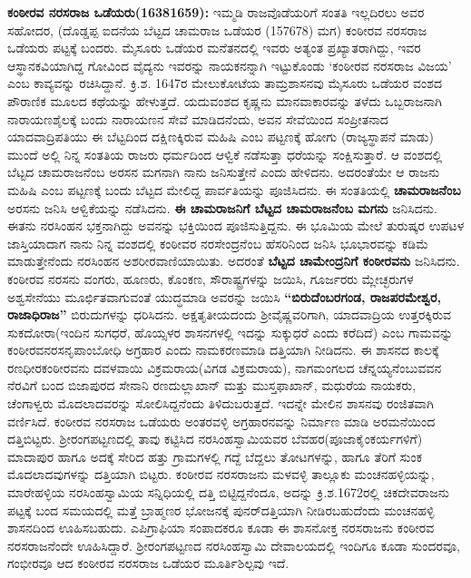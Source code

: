 \textbf{ ಕಂಠೀರವ ನರಸರಾಜ ಒಡೆಯರು(16381659):} ಇಮ್ಮಡಿ ರಾಜವೊಡೆಯರಿಗೆ ಸಂತತಿ ಇಲ್ಲದಿರಲು ಅವರ ಸಹೋದರ, (ದೊಡ್ಡಪ್ಪ ಐದನೆಯ ಬೆಟ್ಟದ ಚಾಮರಾಜ ಒಡೆಯರ (157678) ಮಗ) ಕಂಠೀರವ ನರಸರಾಜ ಒಡೆಯರು ಪಟ್ಟಕ್ಕೆ ಬಂದರು. ಮೈಸೂರು ಒಡೆಯರ ಮನೆತನದಲ್ಲಿ ಇವರು ಅತ್ಯಂತ ಪ್ರಖ್ಯಾತರಾಗಿದ್ದು, ಇವರ ಆಸ್ಥಾನಕವಿಯಾಗಿದ್ದ ಗೋವಿಂದ ವೈದ್ಯನು ಇವರನ್ನು ನಾಯಕನನ್ನಾಗಿ ಇಟ್ಟುಕೊಂಡು ‘ಕಂಠೀರವ ನರಸರಾಜ ವಿಜಯ’ ಎಂಬ ಕಾವ್ಯವನ್ನು ರಚಿಸಿದ್ದಾನೆ. ಕ್ರಿ.ಶ. 1647ರ ಮೇಲುಕೋಟೆಯ ತಾಮ್ರಶಾಸನವು ಮೈಸೂರು ಒಡೆಯರ ವಂಶದ ಪೌರಾಣಿಕ ಮೂಲದ ಕಥೆಯನ್ನು ಹೇಳುತ್ತದೆ. ಯದುವಂಶದ ಕೃಷ್ಣನು ಮಾನವಾಕಾರವನ್ನು ತಳೆದು ಒಬ್ಬರಾಜನಾಗಿ ನಾರಾಯಣಶೈಲಕ್ಕೆ ಬಂದು ನಾರಾಯಣನ ಸೇವೆ ಮಾಡಿದನೆಂದು, ಅವನ ಸೇವೆಯಿಂದ ಸಂಪ್ರೀತನಾದ ಯಾದವಾದ್ರಿಪತಿಯು ಈ ಬೆಟ್ಟದಿಂದ ದಕ್ಷಿಣಕ್ಕಿರುವ ಮಹಿಷಿ ಎಂಬ ಪಟ್ಟಣಕ್ಕೆ ಹೋಗು (ರಾಜ್ಯಸ್ಥಾಪನೆ ಮಾಡು) ಮುಂದೆ ಅಲ್ಲಿ ನಿನ್ನ ಸಂತತಿಯ ರಾಜರು ಧರ್ಮದಿಂದ ಆಳ್ವಿಕೆ ನಡೆಸುತ್ತಾ ಧರೆಯನ್ನು ಸಂಕ್ಷಿಸುತ್ತಾರೆ. ಆ ವಂಶದಲ್ಲಿ ಬೆಟ್ಟದ ಚಾಮರಾಜನೆಂಬ ಅರಸನ ಮಗನಾಗಿ ನಾನು ಜನಿಸುತ್ತೇನೆ ಎಂದು ಹೇಳಿದನು. ಅದರಂತೆಯೇ ಆ ರಾಜನು ಮಹಿಷಿ ಎಂಬ ಪಟ್ಟಣಕ್ಕೆ ಬಂದು ಬೆಟ್ಟದ ಮೇಲಿದ್ದ ಪಾರ್ವತಿಯನ್ನು ಪೂಜಿಸಿದನು. ಈ ಸಂತತಿಯಲ್ಲಿ \textbf{ಚಾಮರಾಜನೆಂಬ} ಅರಸನು ಜನಿಸಿ ಆಳ್ವಿಕೆಯನ್ನು ನಡೆಸಿದನು. \textbf{ಈ ಚಾಮರಾಜನಿಗೆ ಬೆಟ್ಟದ ಚಾಮರಾಜನೆಂಬ ಮಗನು} ಜನಿಸಿದನು. ಈತನು ನರಸಿಂಹನ ಭಕ್ತನಾಗಿದ್ದು ಅವನನ್ನು ಭಕ್ತಿಯಿಂದ ಪೂಜಿಸುತ್ತಿದ್ದನು. ಈ ಭೂಮಿಯ ಮೇಲೆ ತುರುಷ್ಕರ ಉಪಟಳ ಜಾಸ್ತಿಯಾದಾಗ ನಾನು ನಿನ್ನ ವಂಶದಲ್ಲಿ ಕಂಠೀವರ ನರಸೇಂದ್ರನೆಂಬ ಹೆಸರಿನಿಂದ ಜನಿಸಿ ಭೂಭಾರವನ್ನು ಕಡಿಮೆ ಮಾಡುತ್ತೇನೆಂದು ನರಸಿಂಹನ ಅಶರೀರವಾಣಿಯಾಯಿತು. ಅದರಂತೆ \textbf{ಬೆಟ್ಟದ ಚಾಮೇಂದ್ರನಿಗೆ ಕಂಠೀರವನು} ಜನಿಸಿದನು. ಕಂಠೀರವ ನರಸನು ವಂಗರು, ಹೂಣರು, ಕೊಂಕಣ, ಸೌರಾಷ್ಟ್ರಗಳನ್ನು ಜಯಿಸಿ, ಗೂರ್ಜರರು ಮ್ಲೇಚ್ಛರುಗಳ ಅಶ್ವಸೇನೆಯು ಮೂರ್ಛಿತವಾಗುವಂತೆ ಯುದ್ಧಮಾಡಿ ಅವರನ್ನು ಜಯಿಸಿ \textbf{“ಬಿರುದೆಂಬರಗಂಡ, ರಾಜಪರಮೇಶ್ವರ, ರಾಜಾಧಿರಾಜ”} ಬಿರುದುಗಳನ್ನು ಧರಿಸಿದನು. ಅಕ್ಷತೃತೀಯದಂದು ಶ‍್ರೀವೈಷ್ಣವರಿಗಾಗಿ, ಯಾದವಾದ್ರಿಯ ಉತ್ತರಕ್ಕಿರುವ ಸುಕದೋರಾ(ಇಂದಿನ ಸುಗಧರೆ, ಹೊಯ್ಸಳರ ಶಾಸನಗಳಲ್ಲಿ ಇದನ್ನು ಸುಕ್ಕುಧರೆ ಎಂದು ಕರೆದಿದೆ) ಎಂಬ ಗಾಮವನ್ನು ಕಂಠೀರವನರಸನೃಪಾಂಬೋಧಿ ಅಗ್ರಹಾರ ಎಂದು ನಾಮಕರಣಮಾಡಿ ದತ್ತಿಯಾಗಿ ನೀಡಿದನು. ಈ ಶಾಸನದ ಕಾಲಕ್ಕೆ ರಣಧೀರಕಂಠೀರವನು ದವಳವಾಯಿ ವಿಕ್ರಮರಾಯ(ವಿಗಡ ವಿಕ್ರಮರಾಯ), ನಾಗಮಂಗಲದ ಚೆನ್ನಯ್ಯನೆಂಬುವವನ ನೆರವಿಗೆ ಬಂದ ಬಿಜಾಪುರದ ಸೇನಾನಿ ರಣದುಲ್ಲಾಖಾನ್​ ಮತ್ತು ಮುಸ್ತಫಾಖಾನ್​, ಮಧುರೆಯ ನಾಯಕರು, ಚೆಂಗಾಳ್ವರು ಮೊದಲಾದವರನ್ನು ಸೋಲಿಸಿದ್ದನೆಂದು ತಿಳಿದುಬರುತ್ತದೆ. ಇದನ್ನೇ ಮೇಲಿನ ಶಾಸನವು ರಂಜಿತವಾಗಿ ವರ್ಣಿಸಿದೆ. ಕಂಠೀರವ ನರಸರಾಜ ಒಡೆಯರು ಅಂತರವಳ್ಳಿ ಅಗ್ರಹಾರನವನ್ನು ನಿರ್ಮಾಣ ಮಾಡಿ ಅರಮನೆಯಿಂದ ದತ್ತಿಬಿಟ್ಟರು. ಶ‍್ರೀರಂಗಪಟ್ಟಣದಲ್ಲಿ ತಾವು ಕಟ್ಟಿಸಿದ ನರಸಿಂಹಸ್ವಾಮಿಯವರ ಬೆವಹರ(ಪೂಜಾಕೈಂಕರ್ಯ\-ಗಳಿಗೆ) ಮಾದಾಪುರ ಹಾಗೂ ಅದಕ್ಕೆ ಸೇರಿದ ಹತ್ತು ಗ್ರಾಮಗಳಲ್ಲಿ ಗದ್ದೆ ಬೆದ್ದಲು ತೋಟಗಳನ್ನು, ಹಾಗೂ ತೆರಿಗೆ ಸುಂಕ ಮೊದಲಾದವುಗಳನ್ನು ದತ್ತಿಯಾಗಿ ಬಿಟ್ಟರು. ಕಂಠೀರವ ನರಸರಾಜನು ಮಳವಳ್ಳಿ ತಾಲ್ಲೂಕು ಮಂಚನಹಳ್ಳಿಯನ್ನು, ಮಾರೇಹಳ್ಳಿಯ ನರಸಿಂಹಸ್ವಾಮಿಯ ಸನ್ನಿಧಿಯಲ್ಲಿ ದತ್ತಿ ಬಿಟ್ಟಿದ್ದನೆಂದೂ, ಅದನ್ನು ಕ್ರಿ.ಶ.1672ರಲ್ಲಿ ಚಿಕದೇವರಾಜನು ಪಟ್ಟಕ್ಕೆ ಬಂದ ಸಮಯದಲ್ಲಿ ಮತ್ತೆ ಬ್ರಾಹ್ಮಣರ ಭೋಜನಕ್ಕೆ ಪುನರ್​ ದತ್ತಿಯಾಗಿ ನೀಡಿರಬಹುದೆಂದು ಮಂಚನಹಳ್ಳಿ ಶಾಸನದಿಂದ ಊಹಿಸಬಹುದು. ಎಪಿಗ್ರಾಫಿಯಾ ಸಂಪಾದಕರೂ ಕೂಡಾ ಈ ಶಾಸನೋಕ್ತ ನರಸರಾಜನು ಕಂಠೀರವ ನರಸರಾಜನೆಂದೇ ಊಹಿಸಿದ್ದಾರೆ. ಶ‍್ರೀರಂಗಪಟ್ಟಣದ ನರಸಿಂಹಸ್ವಾಮಿ ದೇವಾಲಯದಲ್ಲಿ ಇಂದಿಗೂ ಕೂಡಾ ಸುಂದರವೂ, ಗಂಭೀರವೂ ಆದ ಕಂಠೀರವ ನರಸರಾಜ ಒಡೆಯರ ಮೂರ್ತಿಶಿಲ್ಪವು ಇದೆ.


